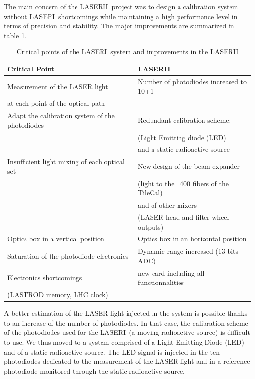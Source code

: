 \documentclass[UKenglish,texlive=2013]{\ATLASLATEXPATH atlasdoc}
\newcommand{\lasi}{{\sc LASERI}}
\newcommand{\lasii}{{\sc LASERII}}
\begin{document}
The main concern of the \lasii~project was to design a calibration system without \lasi~shortcomings while maintaining a high performance level in terms of precision and stability. The major improvements are summarized in table \ref{tab:lasii_imp}.
\begin{table}[!htpb]
 \begin{center}
 \begin{tabular}{|l|l|}
\hline
Critical Point & \lasii \\
\hline
Measurement of the LASER light & Number of photodiodes increased to 10+1 \\
at each point of the optical path & \\
\hline
Adapt the calibration system of the photodiodes & Redundant calibration scheme: \\
& (Light Emitting diode (LED) \\
& and a static radioactive source \\
\hline
Insufficient light mixing of each optical set & New design of the beam expander \\
& (light to the ~400 fibers of the TileCal)  \\
& and of other mixers \\
& (LASER head and filter wheel outputs) \\
\hline
Optics box in a vertical position & Optics box in an horizontal position\\
\hline
Saturation of the photodiode electronics & Dynamic range increased  (13 bits-ADC) \\
\hline
Electronics shortcomings  & new card including all functionnalities \\
(LASTROD memory, LHC clock) & \\
\hline
\end{tabular}
\caption{Critical points of the \lasi~system and improvements in the \lasii}\label{tab:lasii_imp}
\end{center}
\end{table}
\par
A better estimation of the LASER light injected in the system is possible thanks to an increase of the number of photodiodes. In that case, the calibration scheme of the photodiodes used for the \lasi~(a moving radioactive source) is difficult to use. We thus moved to a system comprised of a Light Emitting Diode (LED) and of a static radioactive source. The LED signal is injected in the ten photodiodes dedicated to the measurement of the LASER light and in a reference photodiode monitored through the static radioactive source. 
\end{document}
